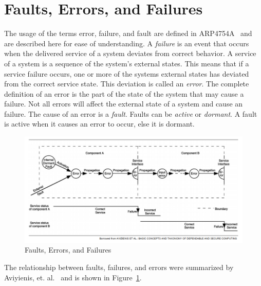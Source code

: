 \section{Faults, Errors, and Failures}
\label{sec:terminology}
The usage of the terms error, failure, and fault are defined in ARP4754A~\cite{SAE:ARP4754A} and are described here for ease of understanding. A \textit{failure} is an event that occurs when the delivered service of a system deviates from correct behavior. A service of a system is a sequence of the system's external states. This means that if a service failure occurs, one or more of the systems external states has deviated from the correct service state. This deviation is called an \textit{error}. The complete definition of an error is the part of the state of the system that may cause a failure. Not all errors will affect the external state of a system and cause an failure. The cause of an error is a \textit{fault}. Faults can be \textit{active} or \textit{dormant}. A fault is active when it causes an error to occur, else it is dormant.

\begin{figure}
	\vspace{-0.956in}
	\centering
	\includegraphics[width=1.0\textwidth]{images/fault_error_failure.png}
	\caption{Faults, Errors, and Failures}
	\label{fig:fault_error_failure}
\end{figure}

The relationship between faults, failures, and errors were summarized by Aviyienis, et. al.~\cite{basicConcepts} and is shown in Figure~\ref{fig:fault_error_failure}.

